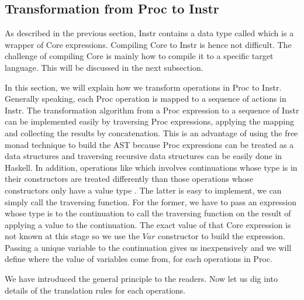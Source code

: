 \subsection{Transformation from Proc to Instr}
As described in the previous section, Instr contains a data type called  which is a wrapper of Core expressions. Compiling Core to Instr is hence not difficult. The challenge of compiling Core is mainly how to compile it to a specific target language. This will be discussed in the next subsection.  

In this section, we will explain how we transform operations in Proc to Instr. Generally speaking, each Proc operation is mapped to a sequence of actions in Instr. The transformation algorithm from a Proc expression to a sequence of Instr can be implemented easily by traversing Proc expressions, applying the mapping and collecting the results by concatenation. This is an advantage of using the free monad technique to build the AST because Proc expressions can be treated as a data structures and traversing recursive data structures can be easily done in Haskell. In addition, operations like  which involves continuations whose type is  in their constructors are treated differently than those operations whose constructors only have a value type . The latter is easy to implement, we can simply call the traversing function. For the former, we have to pass an expression whose type is  to the continuation to call the traversing function on the result of applying a value to the continuation. The exact value of that Core expression is not known at this stage so we use the $Var$ constructor to build the expression. Passing a unique variable to the continuation gives us  inexpensively and we will define where the value of variables come from, for each operations in Proc. 

We have introduced the general principle to the readers. Now let us dig into details of the translation rules for each operations. 

